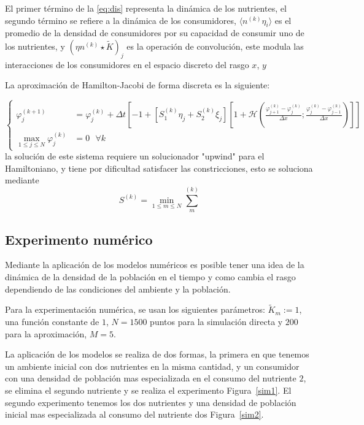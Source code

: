 El primer término de la \eqref{eq:dis} representa la dinámica de los nutrientes, el segundo término se refiere a la dinámica de los consumidores, $\langle{n^{(k)}\eta_{i}}\rangle$ es el promedio de la densidad de consumidores por su capacidad de consumir uno de los nutrientes, y $(\eta n^{(k)}\star \tilde{K})_{j}$ es la operación de convolución, este modula las interacciones de los consumidores en el espacio discreto del rasgo $x$, $y$

La aproximación de Hamilton-Jacobi de forma discreta es la siguiente:

\begin{equation}
	\left\{
	\begin{aligned}
		\label{HJ_dis}
		\varphi_{j}^{(k+1)}                   & =\varphi_{j}^{(k)}+\Delta t\left[ -1+[S_{1}^{(k)}\eta_{j}+S_{2}^{(k)}\xi_{j}]\left[ 1+\mathcal{H}\left( \frac{\varphi_{j+1}^{(k)}-\varphi_{j}^{(k)}}{\Delta x};\frac{\varphi_{j}^{(k)}-\varphi_{j-1}^{(k)}}{\Delta x} \right) \right] \right] \\
		\max_{1\leq j\leq N}\varphi_{j}^{(k)} & =0\:\:\: \forall k
	\end{aligned}
	\right.
\end{equation}
la solución de este sistema requiere un solucionador "upwind" para el Hamiltoniano, y tiene por dificultad satisfacer las constricciones, esto se soluciona mediante
\begin{equation*}
	S^{(k)} = \min_{1\leq m\leq N}\sum_m^{(k)}
\end{equation*}

\subsection{Experimento numérico}
Mediante la aplicación de los modelos numéricos es posible tener una idea de la dinámica de la densidad de la población en el tiempo y como cambia el rasgo dependiendo de las condiciones del ambiente y la población.

Para la experimentación numérica, se usan los siguientes parámetros: $\tilde{K}_m:=1$, una función constante de $1$, $N=1500$ puntos para la simulación directa y $200$ para la aproximación, $M=5$\citep{dieckman2005}.

La aplicación de los modelos se realiza de dos formas, la primera en que tenemos un ambiente inicial con dos nutrientes en la misma cantidad, y un consumidor con una densidad de población mas especializada en el consumo del nutriente $2$, se elimina el segundo nutriente y se realiza el experimento Figura~\ref{sim1}. El segundo experimento tenemos los dos nutrientes y una densidad de población inicial mas especializada al consumo del nutriente dos Figura~\ref{sim2}.

